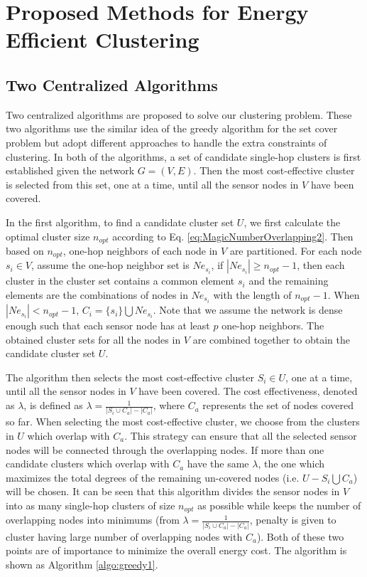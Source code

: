 \section{Proposed Methods for Energy Efficient Clustering}
\label{sec:solution}
\subsection{Two Centralized Algorithms}
\label{sec:centralizedsolution}
Two centralized algorithms are proposed to solve our clustering problem. These two algorithms use the similar idea of the greedy algorithm for the set cover problem but adopt different approaches to handle the extra constraints of clustering. In both of the algorithms, a set of candidate single-hop clusters is first established given the network  \(G =(V,E)\). Then the most cost-effective cluster is selected from this set, one at a time, until all the sensor nodes in \(V\) have been covered.  

In the first algorithm, to find a candidate cluster set \(U\), we first calculate the optimal cluster size \(n_{opt}\) according to Eq. \ref{eq:MagicNumberOverlapping2}. Then based on \(n_{opt}\), one-hop neighbors of each node in \(V\) are partitioned. For each node \(s_i \in V\), assume the one-hop neighbor set is \(Ne_{s_i}\), if \( \left|Ne_{s_i}\right| \geq n_{opt}-1\), then each cluster in the cluster set contains a common element \(s_i\) and the remaining elements are the combinations of nodes in \(Ne_{s_i}\) with the length of \(n_{opt}-1\). When \(\left|Ne_{s_i}\right| < n_{opt} -1\), \(C_i =\{s_i\} \bigcup Ne_{s_i}\). Note that we assume the network is dense enough such that each sensor node has at least \(p\) one-hop neighbors. The obtained cluster sets for all the nodes in \(V\) are combined together to obtain the candidate cluster set \(U\).

The algorithm then selects the most cost-effective cluster \(S_i \in U\), one at a time, until all the sensor nodes in \(V\) have been covered. The cost effectiveness, denoted as \(\lambda\), is defined as \(\lambda = \frac{1}{\left|S_i\cup C_a\right| - \left|C_a\right|}\), where \(C_a\) represents the set of nodes covered so far. When selecting the most cost-effective cluster, we choose from the clusters in \(U\) which overlap with \(C_a\). This strategy can ensure that all the selected sensor nodes will be connected through the overlapping nodes.  If more than one candidate clusters which overlap with \(C_a\) have the same \(\lambda\), the one which maximizes the total degrees of the remaining un-covered nodes (i.e. \(U- S_i\bigcup C_a\)) will be chosen. It can be seen that this algorithm divides the sensor nodes in \(V\) into as many single-hop clusters of size \(n_{opt}\) as possible while keeps the number of overlapping nodes into minimums (from \(\lambda = \frac{1}{\left|S_i\cup C_a\right| - \left|C_a\right|}\), penalty is given to cluster having large number of overlapping nodes with \(C_a\)). Both of these two points are of importance to minimize the overall energy cost. The algorithm is shown as Algorithm \ref{algo:greedy1}.


